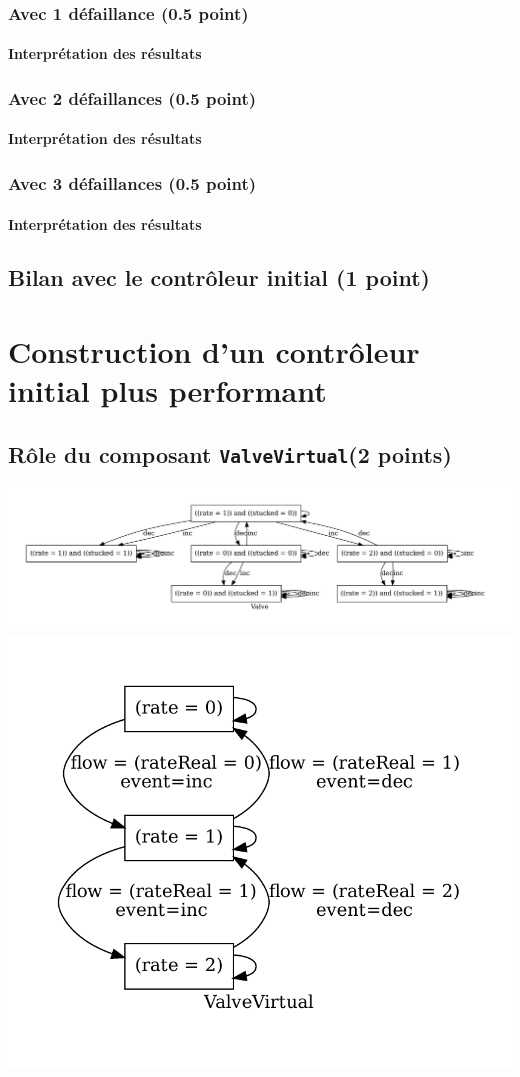 \documentclass[a4paper]{book}
\begin{document}
\subsubsection{Avec 1 défaillance (0.5 point)}

\paragraph{Interprétation des résultats}

\subsubsection{Avec 2 défaillances (0.5 point)}

\paragraph{Interprétation des résultats}

\subsubsection{Avec 3 défaillances (0.5 point)}

\paragraph{Interprétation des résultats}

\subsection{Bilan avec le contrôleur initial (1 point)}

\section{Construction d'un contrôleur initial plus performant}
\subsection{Rôle du composant {\tt ValveVirtual}(2 points)}
\includegraphics[height=.2\textheight,width=.5\textwidth]{Graphs/Valve-modes.pdf}
\includegraphics[height=.2\textheight,width=.5\textwidth]{Graphs/ValveVirtual-modes.pdf}
\end{document}
